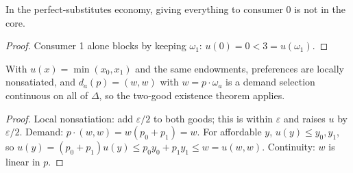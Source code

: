 \begin{theorem}
\label{thm:ge_blocked_example}
\leanok
{}
In the perfect-substitutes economy, giving everything to consumer 0 is not in the core.
\end{theorem}
\begin{proof}
\leanok
Consumer 1 alone blocks by keeping $\omega_1$: $u(0) = 0 < 3 = u(\omega_1)$.
\end{proof}

\begin{theorem}
\label{thm:ge_leon_example}
\leanok
{}
With $u(x) = \min(x_0, x_1)$ and the same endowments, preferences are locally nonsatiated, and $d_a(p) = (w, w)$ with
$w = p \cdot \omega_a$ is a demand selection continuous on all of $\Delta$, so the two-good existence theorem applies.
\end{theorem}
\begin{proof}
\leanok
Local nonsatiation: add $\varepsilon/2$ to both goods; this is within $\varepsilon$ and raises $u$ by $\varepsilon/2$.
Demand: $p \cdot (w, w) = w(p_0 + p_1) = w$. For affordable $y$, $u(y) \le y_0, y_1$, so
$u(y) = (p_0 + p_1) u(y) \le p_0 y_0 + p_1 y_1 \le w = u(w, w)$. Continuity: $w$ is linear in $p$.
\end{proof}
